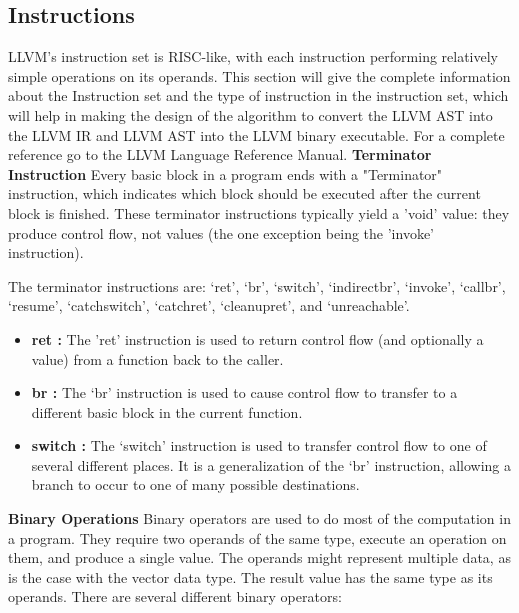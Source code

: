 \documentclass[openany]{book}
\begin{document}
	\subsection{Instructions}
	LLVM's instruction set is RISC-like, with each instruction performing relatively simple operations on its operands. This section will give the complete information about the Instruction set and the type of instruction in the instruction set, which will help in making the design of the algorithm to convert the LLVM AST into the LLVM IR and LLVM AST into the LLVM binary executable. For a complete reference go to the LLVM Language Reference Manual.\newline \newline
	\textbf{Terminator Instruction} \newline \newline
	Every basic block in a program ends with a "Terminator"  instruction, which indicates which block should be executed after the current block is finished. These terminator instructions typically yield a 'void' value: they produce control flow, not values (the one exception being the 'invoke' instruction).\newline
	
	The terminator instructions are: `ret',  `br', `switch', `indirectbr', `invoke', `callbr', `resume', `catchswitch', `catchret', `cleanupret', and `unreachable'.
	
	\begin{itemize}
		\item \textbf{ret :} The 'ret' instruction is used to return control flow (and optionally a value) from a function back to the caller.
		\item \textbf{br :} The `br' instruction is used to cause control flow to transfer to a different basic block in the current function.
		\item \textbf{switch :} The `switch' instruction is used to transfer control flow to one of several different places. It is a generalization of the `br' instruction, allowing a branch to occur to one of many possible destinations.  
	\end{itemize}

	\textbf{Binary Operations} \newline \newline
	Binary operators are used to do most of the computation in a program. They require two operands of the same type, execute an operation on them, and produce a single value. The operands might represent multiple data, as is the case with the vector data type. The result value has the same type as its operands.\newpage
	There are several different binary operators:
	
\end{document}
